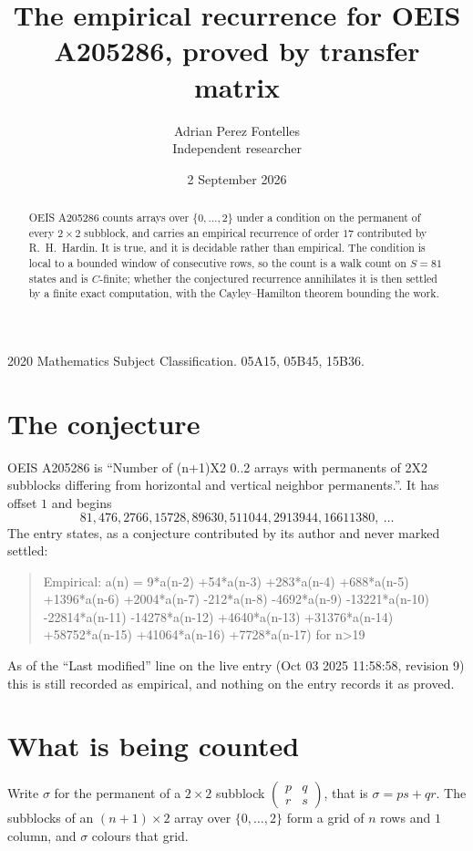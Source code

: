 \documentclass[11pt,a4paper]{article}
\title{The empirical recurrence for OEIS A205286, proved by transfer matrix}
\author{Adrian Perez Fontelles\\ \small Independent researcher}
\date{2 September 2026}
\theoremstyle{plain}
\theoremstyle{definition}
\begin{document}
\maketitle

\begin{abstract}
OEIS A205286 counts arrays over $\{0,\dots,2\}$ under a condition on the permanent of every
$2\times2$ subblock, and carries an empirical recurrence of order $17$ contributed by
R.~H.~Hardin. It is true, and it is decidable rather than empirical. The condition is local to
a bounded window of consecutive rows, so the count is a walk count on $S=81$ states and is
$C$-finite; whether the conjectured recurrence annihilates it is then settled by a finite exact
computation, with the Cayley--Hamilton theorem bounding the work.
\end{abstract}

\noindent\small 2020 Mathematics Subject Classification. 05A15, 05B45, 15B36.\normalsize

\section{The conjecture}

OEIS A205286 is ``Number of (n+1)X2 0..2 arrays with permanents of 2X2 subblocks differing from horizontal and vertical neighbor permanents.''. It has offset $1$ and begins
\[
81, 476, 2766, 15728, 89630, 511044, 2913944, 16611380,\ \dots
\]
The entry states, as a conjecture contributed by its author and never marked settled:
\begin{quote}
Empirical: a(n) = 9*a(n-2) +54*a(n-3) +283*a(n-4) +688*a(n-5) +1396*a(n-6) +2004*a(n-7) -212*a(n-8) -4692*a(n-9) -13221*a(n-10) -22814*a(n-11) -14278*a(n-12) +4640*a(n-13) +31376*a(n-14) +58752*a(n-15) +41064*a(n-16) +7728*a(n-17) for n>19
\end{quote}
As of the ``Last modified'' line on the live entry (Oct 03 2025 11:58:58, revision 9) this is still
recorded as empirical, and nothing on the entry records it as proved.

\section{What is being counted}

Write $\sigma$ for the permanent of a $2\times2$ subblock
$\begin{pmatrix}p&q\\r&s\end{pmatrix}$, that is $\sigma=ps+qr$. The subblocks of an
$(n+1)\times2$ array over $\{0,\dots,2\}$ form a grid of $n$ rows and $1$
column, and $\sigma$ colours that grid.
\end{document}
